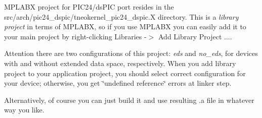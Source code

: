 M\+P\+L\+A\+B\+X project for P\+I\+C24/ds\+P\+I\+C port resides in the {\ttfamily src/arch/pic24\+\_\+dspic/tneokernel\+\_\+pic24\+\_\+dspic.\+X} directory. This is a {\itshape library project} in terms of M\+P\+L\+A\+B\+X, so if you use M\+P\+L\+A\+B\+X you can easily add it to your main project by right-\/clicking {\ttfamily Libraries -\/$>$ Add Library Project ...}.

\begin{DoxyAttention}{Attention}
there are two configurations of this project\+: {\itshape eds} and {\itshape  no\+\_\+eds}, for devices with and without extended data space, respectively. When you add library project to your application project, you should select correct configuration for your device; otherwise, you get \char`\"{}undefined reference\char`\"{} errors at linker step.
\end{DoxyAttention}
Alternatively, of course you can just build it and use resulting {\ttfamily .a} file in whatever way you like. 